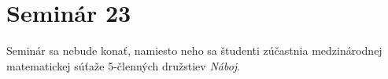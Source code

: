 \section*{Seminár 23}


Seminár sa nebude konať, namiesto neho sa študenti zúčastnia medzinárodnej matematickej súťaže 5-členných družstiev \textit{Náboj}.

